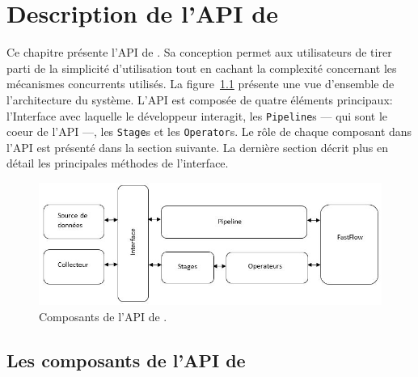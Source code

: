 
\chapter{Description de l'API de \PpFf}
\label{description.chap}


Ce chapitre pr\'esente l'API de \ppff. Sa conception permet aux utilisateurs de tirer parti de la simplicit\'e d'utilisation tout en cachant la complexit\'e concernant les m\'ecanismes concurrents utilis\'es. La figure~\ref{ComponentsAPI.fig} pr\'esente une vue d'ensemble de l'architecture du syst\`eme. L'API est compos\'ee de quatre \'el\'ements principaux: l'Interface avec laquelle le d\'eveloppeur interagit, les \texttt{Pipeline}s --- qui sont le coeur de l'API ---, les \texttt{Stage}s et les \texttt{Operator}s. Le r\^ole de chaque composant dans l'API est pr\'esent\'e dans la section suivante. La derni\`ere section  d\'ecrit plus en d\'etail les principales m\'ethodes de l'interface.



\begin{figure}[ht]
\centering
     \includegraphics[width=1.0\textwidth]{Figures/ComponentsAPI.jpg}
      \caption{Composants de l'API de \ppff.}
       \label{ComponentsAPI.fig}
\end{figure}


\section{Les composants de l'API de \ppff}



